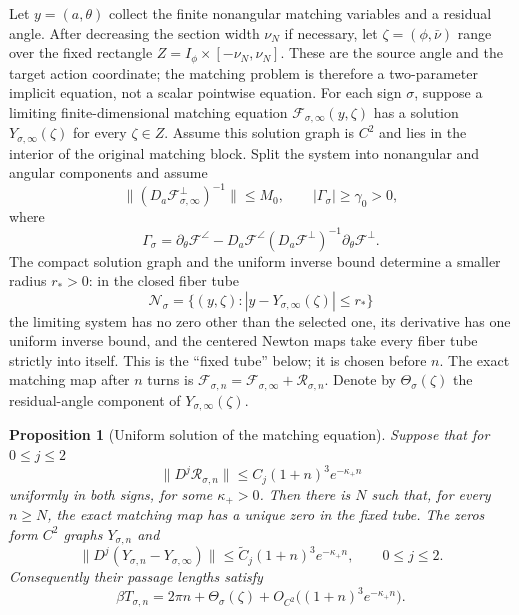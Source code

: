 \documentclass[11pt]{amsart}
\numberwithin{equation}{section}
\newtheorem{proposition}[theorem]{Proposition}
\theoremstyle{definition}
\theoremstyle{remark}
\begin{document}
Let $y=(a,\theta)$ collect the finite nonangular matching variables and a
residual angle.  After decreasing the section width $\nu_N$ if necessary,
let $\zeta=(\phi,\bar\nu)$ range over the fixed rectangle
$Z=I_\phi\times[-\nu_N,\nu_N]$.  These are the source angle and the target
action coordinate; the matching problem
is therefore a two-parameter implicit equation, not a scalar pointwise
equation.
For each sign $\sigma$, suppose a limiting finite-dimensional matching
equation
$\mathcal F_{\sigma,\infty}(y,\zeta)$ has a solution
$Y_{\sigma,\infty}(\zeta)$ for every $\zeta\in Z$.
Assume this solution graph is $C^2$ and lies in the interior of the original
matching block.  Split the system into nonangular and angular components and
assume
\begin{equation}\label{eq:schur-margins}
 \|(D_a\mathcal F^\perp_{\sigma,\infty})^{-1}\|\le M_0,
 \qquad
 |\Gamma_\sigma|\ge\gamma_0>0,
\end{equation}
where
\begin{equation}\label{eq:schur-row}
 \Gamma_\sigma=\partial_\theta\mathcal F^\angle
 -D_a\mathcal F^\angle(D_a\mathcal F^\perp)^{-1}
       \partial_\theta\mathcal F^\perp.
\end{equation}
The compact solution graph and the uniform inverse bound determine a
smaller radius $r_*>0$: in the closed fiber tube
\[
 \mathcal N_\sigma
 =\{(y,\zeta):|y-Y_{\sigma,\infty}(\zeta)|\le r_*\}
\]
the limiting system has no zero other than the selected one, its derivative
has one uniform inverse bound, and the centered Newton maps take every
fiber tube strictly into itself.  This is the ``fixed tube'' below; it is
chosen before $n$.  The exact matching map after $n$ turns is
$\mathcal F_{\sigma,n}=\mathcal F_{\sigma,\infty}
+\mathcal R_{\sigma,n}$.
Denote by $\Theta_\sigma(\zeta)$ the residual-angle component of
$Y_{\sigma,\infty}(\zeta)$.

\begin{proposition}[Uniform solution of the matching equation]\label{prop:selector}
Suppose that for $0\le j\le2$
\begin{equation}\label{eq:row-remainder}
 \|D^j\mathcal R_{\sigma,n}\|
 \le C_j(1+n)^3e^{-\kappa_+n}
\end{equation}
uniformly in both signs, for some $\kappa_+>0$.  Then there is $N$ such
that, for every $n\ge N$, the exact matching map has a unique zero in the fixed
tube.  The zeros form $C^2$ graphs $Y_{\sigma,n}$ and
\begin{equation}\label{eq:selector-estimate}
 \|D^j(Y_{\sigma,n}-Y_{\sigma,\infty})\|
 \le \widetilde C_j(1+n)^3e^{-\kappa_+n},
 \qquad 0\le j\le2.
\end{equation}
Consequently their passage lengths satisfy
\begin{equation}\label{eq:selected-time}
 \beta T_{\sigma,n}
 =2\pi n+\Theta_\sigma(\zeta)
   +O_{C^2}\bigl((1+n)^3e^{-\kappa_+n}\bigr).
\end{equation}
\end{proposition}
\end{document}
